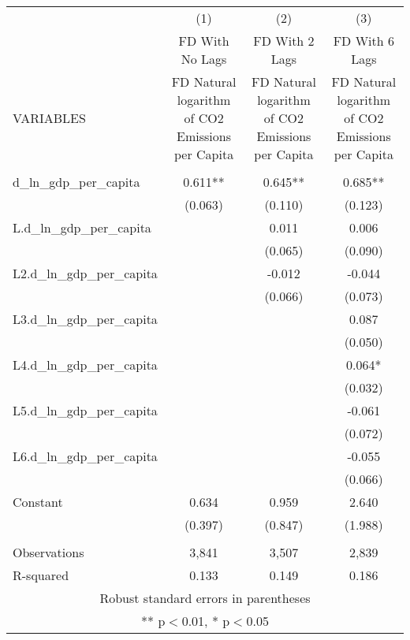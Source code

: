 \begin{tabular}{lccc} \hline
 & (1) & (2) & (3) \\
 & FD With No Lags & FD With 2 Lags & FD With 6 Lags \\
VARIABLES & FD Natural logarithm of CO2 Emissions per Capita & FD Natural logarithm of CO2 Emissions per Capita & FD Natural logarithm of CO2 Emissions per Capita \\ \hline
 &  &  &  \\
d\_ln\_gdp\_per\_capita & 0.611** & 0.645** & 0.685** \\
 & (0.063) & (0.110) & (0.123) \\
L.d\_ln\_gdp\_per\_capita &  & 0.011 & 0.006 \\
 &  & (0.065) & (0.090) \\
L2.d\_ln\_gdp\_per\_capita &  & -0.012 & -0.044 \\
 &  & (0.066) & (0.073) \\
L3.d\_ln\_gdp\_per\_capita &  &  & 0.087 \\
 &  &  & (0.050) \\
L4.d\_ln\_gdp\_per\_capita &  &  & 0.064* \\
 &  &  & (0.032) \\
L5.d\_ln\_gdp\_per\_capita &  &  & -0.061 \\
 &  &  & (0.072) \\
L6.d\_ln\_gdp\_per\_capita &  &  & -0.055 \\
 &  &  & (0.066) \\
Constant & 0.634 & 0.959 & 2.640 \\
 & (0.397) & (0.847) & (1.988) \\
 &  &  &  \\
Observations & 3,841 & 3,507 & 2,839 \\
 R-squared & 0.133 & 0.149 & 0.186 \\ \hline
\multicolumn{4}{c}{ Robust standard errors in parentheses} \\
\multicolumn{4}{c}{ ** p$<$0.01, * p$<$0.05} \\
\end{tabular}
